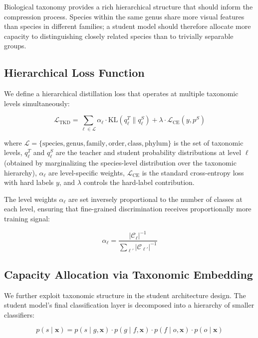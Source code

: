 \documentclass[11pt,a4paper]{article}
\begin{document}
Biological taxonomy provides a rich hierarchical structure that should inform the compression process.
Species within the same genus share more visual features than species in different families; a student model should therefore allocate more capacity to distinguishing closely related species than to trivially separable groups.

\subsection{Hierarchical Loss Function}

We define a hierarchical distillation loss that operates at multiple taxonomic levels simultaneously:

\begin{equation}
    \mathcal{L}_{\text{TKD}} = \sum_{\ell \in \mathcal{L}} \alpha_\ell \cdot \text{KL}\left(q_\ell^T \| q_\ell^S\right) + \lambda \cdot \mathcal{L}_{\text{CE}}(y, p^S)
\end{equation}

\noindent where $\mathcal{L} = \{\text{species}, \text{genus}, \text{family}, \text{order}, \text{class}, \text{phylum}\}$ is the set of taxonomic levels, $q_\ell^T$ and $q_\ell^S$ are the teacher and student probability distributions at level $\ell$ (obtained by marginalizing the species-level distribution over the taxonomic hierarchy), $\alpha_\ell$ are level-specific weights, $\mathcal{L}_{\text{CE}}$ is the standard cross-entropy loss with hard labels $y$, and $\lambda$ controls the hard-label contribution.

The level weights $\alpha_\ell$ are set inversely proportional to the number of classes at each level, ensuring that fine-grained discrimination receives proportionally more training signal:

\begin{equation}
    \alpha_\ell = \frac{|\mathcal{C}_\ell|^{-1}}{\sum_{\ell'} |\mathcal{C}_{\ell'}|^{-1}}
\end{equation}

\subsection{Capacity Allocation via Taxonomic Embedding}

We further exploit taxonomic structure in the student architecture design.
The student model's final classification layer is decomposed into a hierarchy of smaller classifiers:

\begin{equation}
    p(s \mid \mathbf{x}) = p(s \mid g, \mathbf{x}) \cdot p(g \mid f, \mathbf{x}) \cdot p(f \mid o, \mathbf{x}) \cdot p(o \mid \mathbf{x})
\end{equation}
\end{document}
